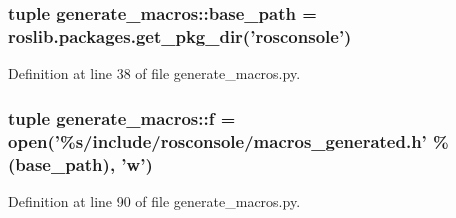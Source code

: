 \subsubsection[{base\_\-path}]{\setlength{\rightskip}{0pt plus 5cm}tuple {\bf generate\_\-macros::base\_\-path} = roslib.packages.get\_\-pkg\_\-dir('rosconsole')}\label{namespacegenerate__macros_a7ec5f277d6ab99473a97d52601300a9a}


Definition at line 38 of file generate\_\-macros.py.

\subsubsection[{f}]{\setlength{\rightskip}{0pt plus 5cm}tuple {\bf generate\_\-macros::f} = open('\%s/include/rosconsole/macros\_\-generated.h' \%({\bf base\_\-path}), 'w')}\label{namespacegenerate__macros_a53422a1d3332391c12f030d90fcc6c38}


Definition at line 90 of file generate\_\-macros.py.

